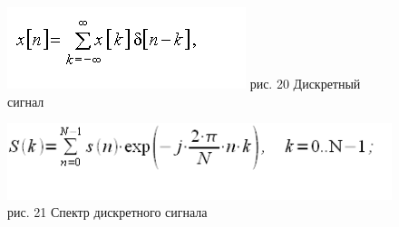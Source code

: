 \documentclass[10pt,a4paper]{report}
\begin{document}
\begin{figure}
\begin{center}
\includegraphics[angle=0, scale = 0.8]{20.png}\newline
рис. 20   Дискретный сигнал
\end{center}
\end{figure}
\begin{figure}
\begin{center}
\includegraphics[angle=0, scale = 0.8]{21.png}\newline
рис. 21    Спектр дискретного сигнала
\end{center}
\end{figure}
\end{document}
